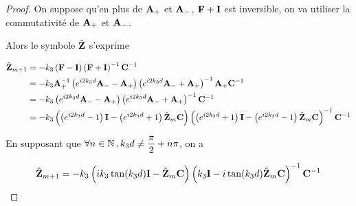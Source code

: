 \begin{proof}
            On suppose qu'en plus de $\mathbf{A}_+$ et $\mathbf{A}_-$, $\mathbf{F} + \mathbf{I}$ est inversible, on va utiliser la commutativité de $\mathbf{A}_+$ et $\mathbf{A}_-$.

            Alors le symbole $\hat {\mathbf{Z}}$ s'exprime

            \begin{align}
                \hat{\mathbf{Z}}_{m+1}
                &=-k_3\left(\mathbf{F} - \mathbf{I} \right)\left(\mathbf{F}+ \mathbf{I} \right)^{-1}\mathbf{C}^{-1}
                \\
                &=-k_3\mathbf{A}_+^{-1}\left(e^{i2 k_3 d}\mathbf{A}_- - \mathbf{A}_+ \right)\left(e^{i2 k_3 d}\mathbf{A}_- + \mathbf{A}_+ \right)^{-1}\mathbf{A}_+\mathbf{C}^{-1}
                \\
                &= -k_3\left( e^{i2 k_3 d} \mathbf{A}_- -  \mathbf{A}_+\right)
                \left( e^{i2 k_3 d} \mathbf{A}_- + \mathbf{A}_+ \right)^{-1}\mathbf{C}^{-1}
                \\
                &= -k_3\left(\left( e^{i2 k_3 d} - 1 \right)\mathbf{I} - \left( e^{i2 k_3 d} + 1 \right) \hat{\mathbf{Z}}_m\mathbf{C} \right)
                \left( \left( e^{i2 k_3 d} + 1 \right)\mathbf{I} - \left( e^{i2 k_3 d} - 1 \right)\hat{\mathbf{Z}}_m\mathbf{C} \right)^{-1}\mathbf{C}^{-1}
            \end{align}

            En supposant que $\forall n \in \mathbb N \,, k_3d\not = \dfrac{\pi}{2}+n\pi$, on a

            \begin{equation}
                \hat{\mathbf{Z}}_{m+1} = -k_3\left(ik_3\tan(k_3 d)\mathbf{I} - \hat{\mathbf{Z}}_m\mathbf{C} \right)
                    \left( k_3\mathbf{I} - i\tan(k_3 d)\hat{\mathbf{Z}}_m\mathbf{C} \right)^{-1}\mathbf{C}^{-1} 
            \end{equation}


        \end{proof}


